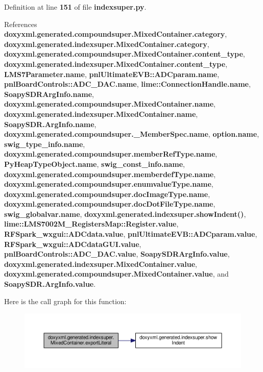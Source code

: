 Definition at line {\bf 151} of file {\bf indexsuper.\+py}.



References {\bf doxyxml.\+generated.\+compoundsuper.\+Mixed\+Container.\+category}, {\bf doxyxml.\+generated.\+indexsuper.\+Mixed\+Container.\+category}, {\bf doxyxml.\+generated.\+compoundsuper.\+Mixed\+Container.\+content\+\_\+type}, {\bf doxyxml.\+generated.\+indexsuper.\+Mixed\+Container.\+content\+\_\+type}, {\bf L\+M\+S7\+Parameter.\+name}, {\bf pnl\+Ultimate\+E\+V\+B\+::\+A\+D\+Cparam.\+name}, {\bf pnl\+Board\+Controls\+::\+A\+D\+C\+\_\+\+D\+A\+C.\+name}, {\bf lime\+::\+Connection\+Handle.\+name}, {\bf Soapy\+S\+D\+R\+Arg\+Info.\+name}, {\bf doxyxml.\+generated.\+compoundsuper.\+Mixed\+Container.\+name}, {\bf doxyxml.\+generated.\+indexsuper.\+Mixed\+Container.\+name}, {\bf Soapy\+S\+D\+R.\+Arg\+Info.\+name}, {\bf doxyxml.\+generated.\+compoundsuper.\+\_\+\+Member\+Spec.\+name}, {\bf option.\+name}, {\bf swig\+\_\+type\+\_\+info.\+name}, {\bf doxyxml.\+generated.\+compoundsuper.\+member\+Ref\+Type.\+name}, {\bf Py\+Heap\+Type\+Object.\+name}, {\bf swig\+\_\+const\+\_\+info.\+name}, {\bf doxyxml.\+generated.\+compoundsuper.\+memberdef\+Type.\+name}, {\bf doxyxml.\+generated.\+compoundsuper.\+enumvalue\+Type.\+name}, {\bf doxyxml.\+generated.\+compoundsuper.\+doc\+Image\+Type.\+name}, {\bf doxyxml.\+generated.\+compoundsuper.\+doc\+Dot\+File\+Type.\+name}, {\bf swig\+\_\+globalvar.\+name}, {\bf doxyxml.\+generated.\+indexsuper.\+show\+Indent()}, {\bf lime\+::\+L\+M\+S7002\+M\+\_\+\+Registers\+Map\+::\+Register.\+value}, {\bf R\+F\+Spark\+\_\+wxgui\+::\+A\+D\+Cdata.\+value}, {\bf pnl\+Ultimate\+E\+V\+B\+::\+A\+D\+Cparam.\+value}, {\bf R\+F\+Spark\+\_\+wxgui\+::\+A\+D\+Cdata\+G\+U\+I.\+value}, {\bf pnl\+Board\+Controls\+::\+A\+D\+C\+\_\+\+D\+A\+C.\+value}, {\bf Soapy\+S\+D\+R\+Arg\+Info.\+value}, {\bf doxyxml.\+generated.\+indexsuper.\+Mixed\+Container.\+value}, {\bf doxyxml.\+generated.\+compoundsuper.\+Mixed\+Container.\+value}, and {\bf Soapy\+S\+D\+R.\+Arg\+Info.\+value}.



Here is the call graph for this function\+:
\nopagebreak
\begin{figure}[H]
\begin{center}
\leavevmode
\includegraphics[width=350pt]{da/df0/classdoxyxml_1_1generated_1_1indexsuper_1_1MixedContainer_aa49e2a1e2f46df293e62ec5191566b31_cgraph}
\end{center}
\end{figure}


